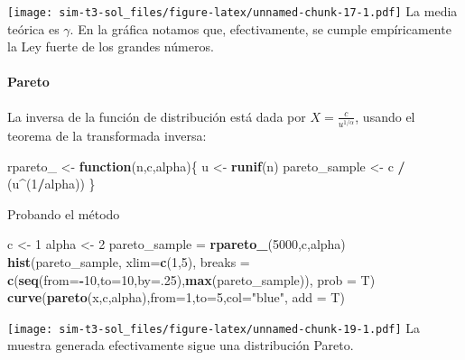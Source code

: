 \documentclass[]{article}
\newenvironment{Shaded}{\begin{snugshade}}{\end{snugshade}}
\newcommand{\ControlFlowTok}[1]{\textcolor[rgb]{0.13,0.29,0.53}{\textbf{#1}}}
\newcommand{\DataTypeTok}[1]{\textcolor[rgb]{0.13,0.29,0.53}{#1}}
\newcommand{\DecValTok}[1]{\textcolor[rgb]{0.00,0.00,0.81}{#1}}
\newcommand{\KeywordTok}[1]{\textcolor[rgb]{0.13,0.29,0.53}{\textbf{#1}}}
\newcommand{\NormalTok}[1]{#1}
\newcommand{\OperatorTok}[1]{\textcolor[rgb]{0.81,0.36,0.00}{\textbf{#1}}}
\newcommand{\StringTok}[1]{\textcolor[rgb]{0.31,0.60,0.02}{#1}}
\let\oldparagraph\paragraph
\renewcommand{\paragraph}[1]{\oldparagraph{#1}\mbox{}}
\begin{document}
\texttt{[image: sim-t3-sol\_files/figure-latex/unnamed-chunk-17-1.pdf]}
La media teórica es \(\gamma\). En la gráfica notamos que,
efectivamente, se cumple empíricamente la Ley fuerte de los grandes
números.

\hypertarget{pareto}{%
\paragraph{Pareto}\label{pareto}}

La inversa de la función de distribución está dada por
\(X = \frac{c}{u^{1/\alpha}}\), usando el teorema de la transformada
inversa:

\begin{Shaded}
\begin{Highlighting}[]
\NormalTok{rpareto_ <-}\StringTok{ }\ControlFlowTok{function}\NormalTok{(n,c,alpha)\{}
\NormalTok{  u <-}\StringTok{ }\KeywordTok{runif}\NormalTok{(n)}
\NormalTok{  pareto_sample <-}\StringTok{ }\NormalTok{c }\OperatorTok{/}\StringTok{ }\NormalTok{(u}\OperatorTok{^}\NormalTok{(}\DecValTok{1}\OperatorTok{/}\NormalTok{alpha))}
\NormalTok{\}}
\end{Highlighting}
\end{Shaded}

Probando el método

\begin{Shaded}
\begin{Highlighting}[]
\NormalTok{c <-}\StringTok{ }\DecValTok{1}
\NormalTok{alpha <-}\StringTok{ }\DecValTok{2}
\NormalTok{pareto_sample =}\StringTok{ }\KeywordTok{rpareto_}\NormalTok{(}\DecValTok{5000}\NormalTok{,c,alpha)}
\KeywordTok{hist}\NormalTok{(pareto_sample, }\DataTypeTok{xlim=}\KeywordTok{c}\NormalTok{(}\DecValTok{1}\NormalTok{,}\DecValTok{5}\NormalTok{), }\DataTypeTok{breaks =} \KeywordTok{c}\NormalTok{(}\KeywordTok{seq}\NormalTok{(}\DataTypeTok{from=}\OperatorTok{-}\DecValTok{10}\NormalTok{,}\DataTypeTok{to=}\DecValTok{10}\NormalTok{,}\DataTypeTok{by=}\NormalTok{.}\DecValTok{25}\NormalTok{),}\KeywordTok{max}\NormalTok{(pareto_sample)), }\DataTypeTok{prob =}\NormalTok{ T)}
\KeywordTok{curve}\NormalTok{(}\KeywordTok{pareto}\NormalTok{(x,c,alpha),}\DataTypeTok{from=}\DecValTok{1}\NormalTok{,}\DataTypeTok{to=}\DecValTok{5}\NormalTok{,}\DataTypeTok{col=}\StringTok{"blue"}\NormalTok{, }\DataTypeTok{add =}\NormalTok{ T)}
\end{Highlighting}
\end{Shaded}

\texttt{[image: sim-t3-sol\_files/figure-latex/unnamed-chunk-19-1.pdf]}
La muestra generada efectivamente sigue una distribución Pareto.
\end{document}
